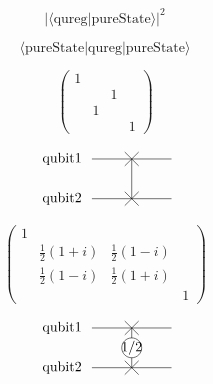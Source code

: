 \documentclass{article}
\begin{document}
\[ 
 |\langle \text{qureg} | \text{pureState} \rangle|^2
\]
\pagebreak

\[ 
 \langle \text{pureState} | \text{qureg} | \text{pureState} \rangle
\]
\pagebreak

\[
\begin{pmatrix}
1 \\
& & 1 \\\
&  1 \\
& & & 1
\end{pmatrix}
\]
\pagebreak

\[
            \begin{tikzpicture}[scale=.5]
            \node[draw=none] at (-3.5, 2) {qubit1};
            \node[draw=none] at (-3.5, 0) {qubit2};

            \draw (-2, 2) -- (2, 2);
            \draw (0, 2) -- (0, 0);
            \draw (-2,0) -- (2, 0);

            \draw (-.35,-.35) -- (.35,.35);
            \draw (-.35,.35) -- (.35,-.35);

            \draw (-.35,-.35 + 2) -- (.35,.35 + 2);
            \draw (-.35,.35 + 2) -- (.35,-.35 + 2);

            \end{tikzpicture}
\]
\pagebreak

\[
\begin{pmatrix}
1 \\
& \frac{1}{2}(1+i) & \frac{1}{2}(1-i) \\\
& \frac{1}{2}(1-i) & \frac{1}{2}(1+i) \\
& & & 1
\end{pmatrix}
\]
\pagebreak

\[
            \begin{tikzpicture}[scale=.5]
            \node[draw=none] at (-3.5, 2) {qubit1};
            \node[draw=none] at (-3.5, 0) {qubit2};

            \draw (-2, 2) -- (2, 2);
            \draw (0, 2) -- (0, 0);
            \draw (-2,0) -- (2, 0);

            \draw (-.35,-.35) -- (.35,.35);
            \draw (-.35,.35) -- (.35,-.35);

            \draw (-.35,-.35 + 2) -- (.35,.35 + 2);
            \draw (-.35,.35 + 2) -- (.35,-.35 + 2);
            
            \draw[fill=white] (0, 1) circle (.5);
            \node[draw=none] at (0, 1) {1/2};

            \end{tikzpicture}
\]
\pagebreak
\end{document}

